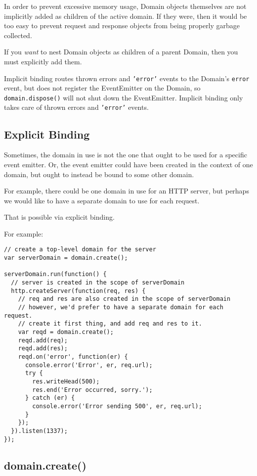 In order to prevent excessive memory usage, Domain objects themselves
are not implicitly added as children of the active domain. If they were,
then it would be too easy to prevent request and response objects from
being properly garbage collected.

If you \emph{want} to nest Domain objects as children of a parent
Domain, then you must explicitly add them.

Implicit binding routes thrown errors and \texttt{'error'} events to the
Domain's \texttt{error} event, but does not register the EventEmitter on
the Domain, so \texttt{domain.dispose()} will not shut down the
EventEmitter. Implicit binding only takes care of thrown errors and
\texttt{'error'} events.

\subsection{Explicit Binding}

Sometimes, the domain in use is not the one that ought to be used for a
specific event emitter. Or, the event emitter could have been created in
the context of one domain, but ought to instead be bound to some other
domain.

For example, there could be one domain in use for an HTTP server, but
perhaps we would like to have a separate domain to use for each request.

That is possible via explicit binding.

For example:

\begin{verbatim}
// create a top-level domain for the server
var serverDomain = domain.create();

serverDomain.run(function() {
  // server is created in the scope of serverDomain
  http.createServer(function(req, res) {
    // req and res are also created in the scope of serverDomain
    // however, we'd prefer to have a separate domain for each request.
    // create it first thing, and add req and res to it.
    var reqd = domain.create();
    reqd.add(req);
    reqd.add(res);
    reqd.on('error', function(er) {
      console.error('Error', er, req.url);
      try {
        res.writeHead(500);
        res.end('Error occurred, sorry.');
      } catch (er) {
        console.error('Error sending 500', er, req.url);
      }
    });
  }).listen(1337);
});
\end{verbatim}

\subsection{domain.create()}

